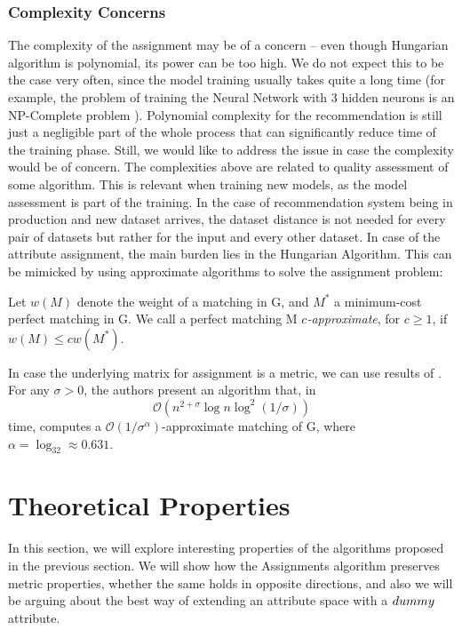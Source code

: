 \subsubsection{Complexity Concerns}
The complexity of the assignment may be of a concern -- even though Hungarian algorithm is polynomial, its power can be too high. We do not expect this to be the case very often, since the model training usually takes quite a long time (for example, the problem of training the Neural Network with 3 hidden neurons is an NP-Complete problem \cite{neuralNetworkNPC}). Polynomial complexity for the recommendation is still just a negligible part of the whole process that can significantly reduce time of the training phase. Still, we would like to address the issue in case the complexity would be of concern. The complexities above are related to quality assessment of some algorithm. This is relevant when training new models, as the model assessment is part of the training. In the case of recommendation system being in production and new dataset arrives, the dataset distance is not needed for every pair of datasets but rather for the input and every other dataset. In case of the attribute assignment, the main burden lies in the Hungarian Algorithm.
This can be mimicked by using approximate algorithms to solve the assignment problem:

\begin{definition}
Let $w(M)$ denote the weight of a matching in G, and $M^*$ a minimum-cost perfect matching in G. We call a perfect matching M \emph{$c$-approximate}, for $c \ge 1$, if $w(M) \le cw(M^*)$. 	
\end{definition}
In case the underlying matrix for assignment is a metric, we can use results of \cite{AgarwalApproximateBipartiteMatchingForMetric}. For any $\sigma > 0$, the authors present an algorithm that, in $$\mathcal{O}(n^{2+\sigma} \log n\log^2(1/\sigma))$$ time, computes a $\mathcal{O}(1/\sigma^\alpha)$-approximate matching of G, where $\alpha = \log_32 \approx 0.631$. 

\section{Theoretical Properties}
\label{section:theoreticalProperties}
In this section, we will explore interesting properties of the algorithms proposed in the previous section. We will show how the Assignments algorithm preserves metric properties, whether the same holds in opposite directions, and also we will be arguing about the best way of extending an attribute space with a $dummy$ attribute.

